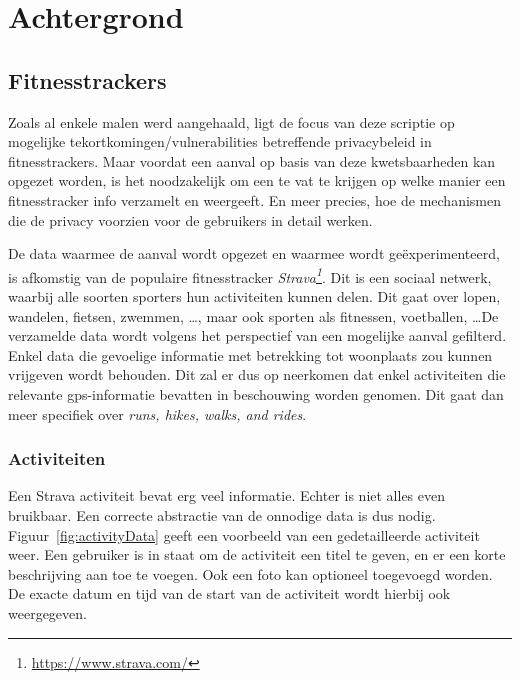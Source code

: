 
\chapter{Achtergrond}

\section{Fitnesstrackers}
Zoals al enkele malen werd aangehaald, ligt de focus van deze scriptie op
mogelijke tekortkomingen/vulnerabilities betreffende privacybeleid in
fitnesstrackers. Maar voordat een aanval op basis van deze kwetsbaarheden kan
opgezet worden, is het noodzakelijk om een te vat te krijgen op welke manier
een fitnesstracker info verzamelt en weergeeft. En meer precies, hoe de
mechanismen die de privacy voorzien voor de gebruikers in detail werken.

De data waarmee de aanval wordt opgezet en waarmee wordt geëxperimenteerd, is
afkomstig van de populaire fitnesstracker
\textit{Strava\footnote{\url{https://www.strava.com/}}}. Dit is een sociaal
netwerk, waarbij alle soorten sporters hun activiteiten kunnen delen. Dit gaat
over lopen, wandelen, fietsen, zwemmen, \ldots, maar ook sporten als fitnessen,
voetballen, \ldots De verzamelde data wordt volgens het perspectief van een
mogelijke aanval gefilterd. Enkel data die gevoelige informatie met betrekking
tot woonplaats zou kunnen vrijgeven wordt behouden. Dit zal er dus op neerkomen
dat enkel activiteiten die relevante gps-informatie bevatten in beschouwing
worden genomen. Dit gaat dan meer specifiek over \textit{runs, hikes, walks,
    and rides}.

\subsection{Activiteiten}\label{data}
Een Strava activiteit bevat erg veel informatie. Echter is niet alles even
bruikbaar. Een correcte abstractie van de onnodige data is dus nodig.
Figuur~\ref{fig:activityData} geeft een voorbeeld van een gedetailleerde
activiteit weer. Een gebruiker is in staat om de activiteit een titel te geven,
en er een korte beschrijving aan toe te voegen. Ook een foto kan optioneel
toegevoegd worden. De exacte datum en tijd van de start van de activiteit wordt
hierbij ook weergegeven.

